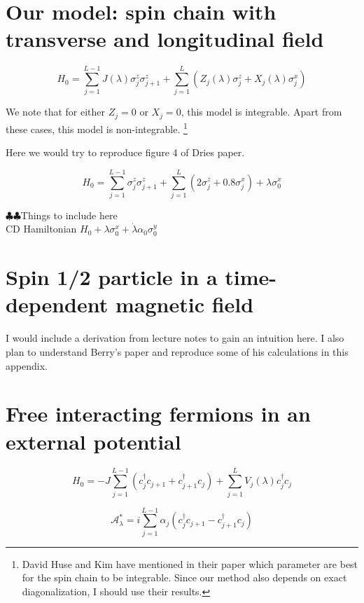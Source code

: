 \documentclass[11pt,a4paper]{article}
\begin{document}
\section{Our model: spin chain with transverse and longitudinal field}

\begin{equation}
H_0=\sum_{j=1}^{L-1} J(\lambda) \sigma_j^z \sigma_{j+1}^z + \sum_{j=1}^{L}  (Z_j (\lambda) \sigma_j^z +X_j (\lambda) \sigma_j^x)
\end{equation}

We note that for either $Z_j=0$ or $X_j=0$, this model is integrable. Apart from these cases, this model is non-integrable. \footnote{David Huse and Kim have mentioned in their paper which parameter are best for the spin chain to be integrable. Since our method also depends on exact diagonalization, I should use their results.}


Here we would try to reproduce figure 4 of Dries paper.

\begin{equation}
H_0=\sum_{j=1}^{L-1}  \sigma_j^z \sigma_{j+1}^z + \sum_{j=1}^{L} (2\sigma_j^z + 0.8 \sigma_j^x ) + \lambda \sigma_0^x
\end{equation}

$\clubsuit \clubsuit $Things to include here \\

CD Hamiltonian $H_0+ \lambda \sigma_0^x + \dot{\lambda} \alpha_0 \sigma_0^y$\\
\appendix

\section{Spin 1/2 particle in a time-dependent magnetic field}
I would include a derivation from lecture notes to gain an intuition here. I also plan to understand Berry's paper and reproduce some of his calculations in this appendix.

\section{Free interacting fermions in an external potential}

\begin{equation}
H_0= -J \sum_{j=1}^{L-1} (c^{\dagger}_j c_{j+1} +c^{\dagger}_{j+1} c_{j}) + \sum_{j=1}^{L} V_j(\lambda) c^{\dagger}_jc_j
\end{equation}


\begin{equation}
\mathcal{A}^*_{\lambda}= i  \sum_{j=1}^{L-1} \alpha_j (c^{\dagger}_j c_{j+1} - c^{\dagger}_{j+1} c_{j}) 
\end{equation}
\end{document}
